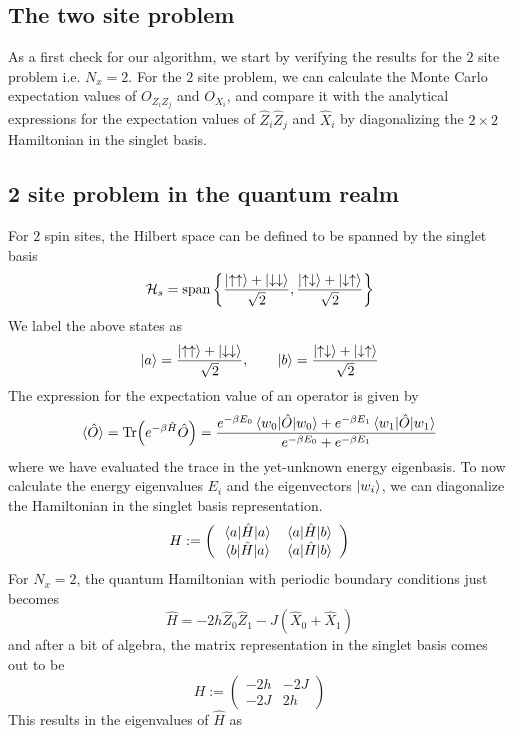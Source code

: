 \documentclass[../thesis_main.tex]{subfiles}
\begin{document}
\subsection{The two site problem}
As a first check for our algorithm, we start by verifying the results for the $2$ site problem i.e. $N_x = 2$. For the $2$ site problem, we can calculate the Monte Carlo expectation values of $O_{Z_i Z_j}$ and $O_{X_i}$, and compare it with the analytical expressions for the expectation values of $\hat{Z}_i \hat{Z}_j$ and $\hat{X}_i$ by diagonalizing the $2 \times 2$ Hamiltonian in the singlet basis.

\subsection{2 site problem in the quantum realm}
For $2$ spin sites, the Hilbert space can be defined to be spanned by the singlet basis
\[
    \mathcal{H}_s = \text{span} \left\{\frac{\ket{\uparrow \uparrow} + \ket{\downarrow\downarrow}}{\sqrt{2}}, \frac{\ket{\uparrow\downarrow} + \ket{\downarrow\uparrow}}{\sqrt{2}} \right\}
\]   
We label the above states as 
\[ \ket{a} = \frac{\ket{\uparrow \uparrow} + \ket{\downarrow\downarrow}}{\sqrt{2}}, \qquad \ket{b} = \frac{\ket{\uparrow\downarrow} + \ket{\downarrow\uparrow}}{\sqrt{2}}\]
The expression for the expectation value of an operator is given by 
\[
    \langle{\hat{O}}\rangle = \Tr(e^{-\beta \hat{H}} \hat{O}) = \frac{e^{-\beta E_0}\mel{w_0}{\hat{O}}{w_0} + e^{-\beta E_1}\mel{w_1}{\hat{O}}{w_1}}{e^{-\beta  E_0} + e^{-\beta E_1}}
\]
where we have evaluated the trace in the yet-unknown energy eigenbasis. To now calculate the energy eigenvalues $E_i$ and the eigenvectors $\ket{w_i}$, we can diagonalize the Hamiltonian in the singlet basis representation.
\[
    H := \left(\begin{array}{cc}
    \mel{a}{\hat{H}}{a} & \mel{a}{\hat{H}}{b} \\ 
    \mel{b}{\hat{H}}{a} & \mel{a}{\hat{H}}{b}
    \end{array}\right)
\]  
For $N_x = 2$, the quantum Hamiltonian with periodic boundary conditions just becomes
\[
    \hat{H} = - 2h \hat{Z}_0 \hat{Z}_1 - J(\hat{X}_0 + \hat{X}_1)
\] 
and after a bit of algebra, the matrix representation in the singlet basis comes out to be
\[
    H:= \left(\begin{array}{cc}
    -2h & -2J \\ 
    -2J & 2h
    \end{array}\right)
\]
This results in the eigenvalues of $\hat{H}$ as 
\end{document}
